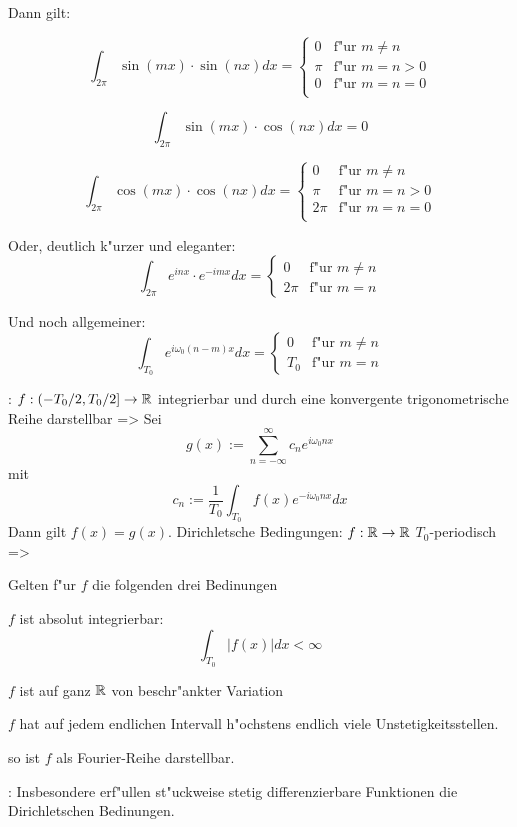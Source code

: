 {
  Dann gilt:
  \begin{stmts}
    \item 
      \[
        \int_{2\pi} \sin(mx) \cdot \sin (nx) dx=
        \begin{cases}
          0 & \text{f"ur $m\ne n$} \\
          \pi & \text{f"ur $m=n>0$} \\
          0 & \text{f"ur $m=n=0$} \\
        \end{cases}
      \]
    \item 
      \[
        \int_{2\pi} \sin(mx) \cdot \cos (nx) dx=0
      \]
    \item 
      \[
        \int_{2\pi} \cos(mx) \cdot \cos (nx) dx=
        \begin{cases}
          0 & \text{f"ur $m\ne n$} \\
          \pi & \text{f"ur $m=n>0$} \\
          2\pi & \text{f"ur $m=n=0$} \\
        \end{cases}
      \]
    \item Oder, deutlich k"urzer und eleganter:
      \[
        \int_{2\pi} e^{inx}\cdot e^{-imx} dx=
        \begin{cases}
          0 & \text{f"ur $m\ne n$} \\
          2\pi & \text{f"ur $m=n$}
        \end{cases}
      \]
    \item Und noch allgemeiner:
      \[
        \int_{T_0} e^{i\omega_0 (n-m) x} dx=
        \begin{cases}
          0 & \text{f"ur $m\ne n$} \\
          T_0 & \text{f"ur $m=n$}
        \end{cases}
      \]
  \end{stmts}
}
\theorem:
  $f:(-T_0/2,T_0/2]\to\mathbb R$ integrierbar und durch 
  eine konvergente trigonometrische Reihe darstellbar
  =>
{
  \label{the:contfourseries}
  Sei
  \[
    g(x):=\sum_{n=-\infty}^\infty c_n e^{i\omega_0 nx}
  \]
  mit
  \[
    c_n:=\frac 1 {T_0} \int_{T_0} f(x) e^{-i\omega_0 nx} dx 
  \]
  Dann gilt $f(x)=g(x)$.
}
\theorem Dirichletsche Bedingungen:
  $f:\mathbb R\to\mathbb R$ $T_0$-periodisch
  =>
{
  Gelten f"ur $f$ die folgenden drei Bedinungen
  \begin{stmts}
    \item $f$ ist absolut integrierbar:
      \[
        \int_{T_0} |f(x)| dx < \infty
      \]
    \item $f$ ist auf ganz $\mathbb R$ von beschr"ankter Variation
    \item $f$ hat auf jedem endlichen Intervall h"ochstens endlich viele
      Unstetigkeitsstellen.
  \end{stmts}
  so ist $f$ als Fourier-Reihe darstellbar.
}
\remark:{
  Insbesondere erf"ullen st"uckweise stetig differenzierbare Funktionen
  die Dirichletschen Bedinungen.
}
